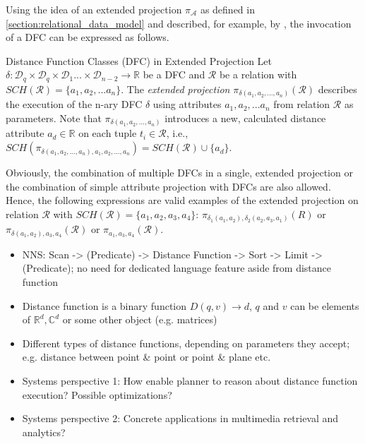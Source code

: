 Using the idea of an extended projection $\pi_{\mathcal{A}}$ as defined in \cref{section:relational_data_model} and described, for example, by \cite{Garcia:2009Database}, the invocation of a DFC can be expressed as follows.

\begin{definition}[label=definition:spf_rel]{Distance Function Classes (DFC) in Extended Projection}{}
Let $\delta \colon \mathcal{D}_q \times \mathcal{D}_q \times \mathcal{D}_{1} ... \times \mathcal{D}_{n-2} \to \mathbb{R}$ be a DFC and $\mathcal{R}$ be a relation with $SCH(\mathcal{R}) = \{ a_1, a_2, ... a_{n} \}$. The \emph{extended projection} $\pi_{\delta(a_1,a_2,...,a_n)}(\mathcal{R})$ describes
the execution of the n-ary DFC $\delta$ using attributes $a_1,a_2,...a_n$ from relation $\mathcal{R}$ as parameters. Note that $\pi_{\delta(a_1,a_2,...,a_n)}$ introduces a new, calculated distance attribute $a_d \in \mathbb{R}$ on each tuple $t_i \in \mathcal{R}$, i.e., $SCH(\pi_{\delta(a_1,a_2,...,a_n), a_1, a_2, ..., a_n}) = SCH(\mathcal{R}) \cup \{ a_d \}$.
\end{definition}

Obviously, the combination of multiple DFCs in a single, extended projection or the combination of simple attribute projection with DFCs are also allowed. Hence, the following expressions are valid examples of the extended projection on relation $\mathcal{R}$ with $SCH(\mathcal{R}) = \{ a_1, a_2, a_3, a_4 \}$: $\pi_{\delta_1(a_1,a_2), \delta_2(a_2,a_3,a_1)}(R)$ or $\pi_{\delta(a_1,a_2), a_3, a_4}(\mathcal{R})$ or $\pi_{a_1, a_3, a_4}(\mathcal{R})$.


\begin{itemize}
    \item NNS: Scan -> (Predicate) -> Distance Function -> Sort -> Limit -> (Predicate); no need for dedicated language feature aside from distance function
    \item Distance function is a binary function $D(q,v) \longrightarrow d$, $q$ and $v$ can be elements of $\mathbb{R}^d,\mathbb{C}^d$ or some other object (e.g. matrices)
    \item Different types of distance functions, depending on parameters they accept; e.g. distance between point \& point or point \& plane etc.
    \item Systems perspective 1: How enable planner to reason about distance function execution? Possible optimizations?
    \item Systems perspective 2: Concrete applications in multimedia retrieval and analytics?
\end{itemize}

